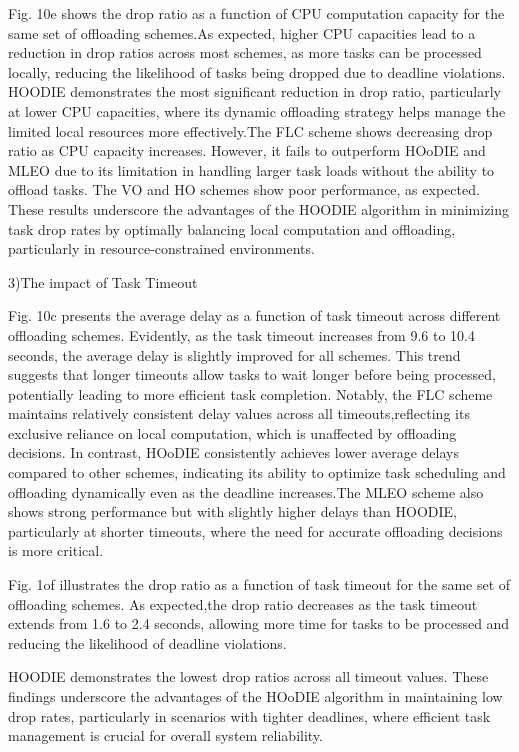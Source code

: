 \documentclass{article}
\begin{document}
Fig. 10e shows the drop ratio as a function of CPU computation capacity for the same set of offloading schemes.As expected, higher CPU capacities lead to a reduction in drop ratios across most schemes, as more tasks can be processed locally, reducing the likelihood of tasks being dropped due to deadline violations. HOODIE demonstrates the most significant reduction in drop ratio, particularly at lower CPU capacities, where its dynamic offloading strategy helps manage the limited local resources more effectively.The FLC scheme shows decreasing drop ratio as CPU capacity increases. However, it fails to outperform HOoDIE and MLEO due to its limitation in handling larger task loads without the ability to offload tasks. The VO and HO schemes show poor performance, as expected. These results underscore the advantages of the HOODIE algorithm in minimizing task drop rates by optimally balancing local computation and offloading, particularly in resource-constrained environments.

3)The impact of Task Timeout

Fig. 10c presents the average delay as a function of task timeout across different offloading schemes. Evidently, as the task timeout increases from 9.6 to 10.4 seconds, the average delay is slightly improved for all schemes. This trend suggests that longer timeouts allow tasks to wait longer before being processed, potentially leading to more efficient task completion. Notably, the FLC scheme maintains relatively consistent delay values across all timeouts,reflecting its exclusive reliance on local computation, which is unaffected by offloading decisions. In contrast, HOoDIE consistently achieves lower average delays compared to other schemes, indicating its ability to optimize task scheduling and offloading dynamically even as the deadline increases.The MLEO scheme also shows strong performance but with slightly higher delays than HOODIE, particularly at shorter timeouts, where the need for accurate offloading decisions is more critical.

Fig. 1of illustrates the drop ratio as a function of task timeout for the same set of offloading schemes. As expected,the drop ratio decreases as the task timeout extends from 1.6 to 2.4 seconds, allowing more time for tasks to be processed and reducing the likelihood of deadline violations.

HOODIE demonstrates the lowest drop ratios across all timeout values. These findings underscore the advantages of the HOoDIE algorithm in maintaining low drop rates, particularly in scenarios with tighter deadlines, where efficient task management is crucial for overall system reliability.
\end{document}
